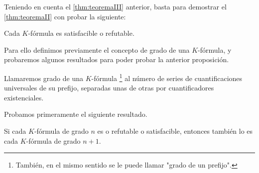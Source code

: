 Teniendo en cuenta el \autoref{thm:teoremaIII} anterior, basta para demostrar el \autoref{thm:teoremaII} con probar la siguiente:

\begin{proposicion} \label{prop:satisf-refut}
    Cada $K$-fórmula es satisfacible o refutable.
\end{proposicion}

Para ello definimos previamente el concepto de grado de una $K$-fórmula, y probaremos algunos resultados para poder probar la anterior
proposición.

\begin{definicion}
    Llamaremos grado de una $K$-fórmula
    \footnote{También, en el mismo sentido se le puede llamar "grado de un prefijo".}
    al número de series de cuantificaciones universales de su prefijo, separadas unas de otras
    por cuantificadores existenciales.
\end{definicion}

Probamos primeramente el siguiente resultado.

\begin{teorema}\label{thm:teoremaIV}
    Si cada $K$-fórmula de grado $n$ es o refutable o satisfacible, entonces también lo es cada $K$-fórmula de grado $n+1$.
\end{teorema}

